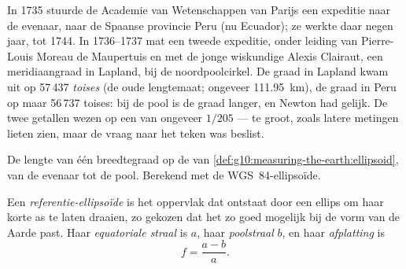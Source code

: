 \begin{history}
In 1735 stuurde de Academie van Wetenschappen van Parijs een expeditie naar de
evenaar, naar de Spaanse provincie Peru (nu Ecuador); ze werkte daar negen jaar,
tot 1744. In 1736--1737 mat een tweede expeditie, onder leiding van
Pierre-Louis Moreau de Maupertuis en met de jonge wiskundige Alexis Clairaut,
een meridiaangraad in Lapland, bij de noordpoolcirkel. De graad in Lapland
kwam uit op 57\,437 \emph{toises} (de oude lengtemaat; ongeveer
\qty{111.95}{km}), de graad in Peru op maar 56\,737 toises: bij de pool is de
graad langer, en Newton had gelijk. De twee getallen wezen op een 
van ongeveer $1/205$ --- te groot, zoals latere metingen lieten zien, maar de
vraag naar het teken was beslist.
\end{history}

\begin{omfigure}

{\small De lengte van één breedtegraad op de  van
\cref{def:g10:measuring-the-earth:ellipsoid}, van de evenaar tot de pool.
Berekend met de WGS~84-ellipsoïde.}
\end{omfigure}

\begin{definition}\label{def:g10:measuring-the-earth:ellipsoid}
Een \emph{referentie-ellipsoïde} is het oppervlak
dat ontstaat door een ellips om haar korte as te laten draaien, zo gekozen dat
het zo goed mogelijk bij de vorm van de Aarde past. Haar \emph{equatoriale straal}
is $a$, haar \emph{poolstraal} $b$, en haar
\emph{afplatting} is
\[
  f = \frac{a-b}{a}.
\]
\end{definition}

